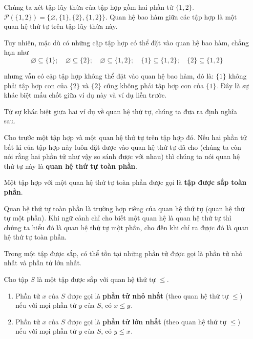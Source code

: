 \begin{example}
    Chúng ta xét tập lũy thừa của tập hợp gồm hai phần tử $\{ 1, 2 \}$. $\mathcal{P}(\{ 1, 2 \}) = \{ \varnothing, \{ 1 \}, \{ 2 \}, \{ 1, 2 \} \}$. Quan hệ bao hàm giữa các tập hợp là một quan hệ thứ tự trên tập lũy thừa này.

    Tuy nhiên, mặc dù có những cặp tập hợp có thể đặt vào quan hệ bao hàm, chẳng hạn như
    \[
        \varnothing\subseteq \{ 1 \};\quad \varnothing\subseteq \{ 2 \};\quad \varnothing\subseteq\{ 1, 2 \};\quad \{ 1 \}\subseteq\{ 1, 2 \};\quad \{ 2 \}\subseteq\{ 1, 2 \}
    \]

    nhưng vẫn có cặp tập hợp không thể đặt vào quan hệ bao hàm, đó là: $\{ 1 \}$ không phải tập hợp con của $\{ 2 \}$ và $\{ 2 \}$ cũng không phải tập hợp con của $\{ 1 \}$. Đây là sự khác biệt mấu chốt giữa ví dụ này và ví dụ liền trước.
\end{example}

Từ sự khác biệt giữa hai ví dụ về quan hệ thứ tự, chúng ta đưa ra định nghĩa sau.
\begin{definition}
    Cho trước một tập hợp và một quan hệ thứ tự trên tập hợp đó. Nếu hai phần tử bất kì của tập hợp này luôn đặt được vào quan hệ thứ tự đã cho (chúng ta còn nói rằng hai phần tử như vậy so sánh được với nhau) thì chúng ta nói quan hệ thứ tự này là \textbf{quan hệ thứ tự toàn phần}.

    \noindent Một tập hợp với một quan hệ thứ tự toàn phần được gọi là \textbf{tập được sắp toàn phần}.
\end{definition}

Quan hệ thứ tự toàn phần là trường hợp riêng của quan hệ thứ tự (quan hệ thứ tự một phần). Khi ngữ cảnh chỉ cho biết một quan hệ là quan hệ thứ tự thì chúng ta hiểu đó là quan hệ thứ tự một phần, cho đến khi chỉ ra được đó là quan hệ thứ tự toàn phần.

Trong một tập được sắp, có thể tồn tại những phần tử được gọi là phần tử nhỏ nhất và phần tử lớn nhất.
\begin{definition}
    Cho tập $S$ là một tập được sắp với quan hệ thứ tự $\leq$.
    \begin{enumerate}[label={(\roman*)}]
        \item Phần tử $x$ của $S$ được gọi là \textbf{phần tử nhỏ nhất} (theo quan hệ thứ tự $\leq$) nếu với mọi phần tử $y$ của $S$, có $x\leq y$.
        \item Phần tử $x$ của $S$ được gọi là \textbf{phần tử lớn nhất} (theo quan hệ thứ tự $\leq$) nếu với mọi phần tử $y$ của $S$, có $y\leq x$.
    \end{enumerate}
\end{definition}

